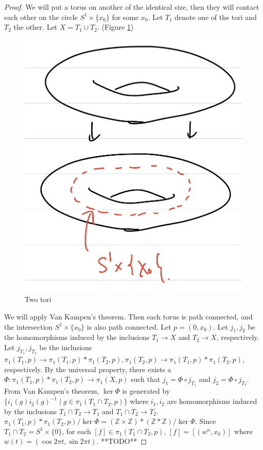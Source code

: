 \documentclass[12pt, psamsfonts]{amsart}
\theoremstyle{definition}
\theoremstyle{remark}
\numberwithin{equation}{section}
\begin{document}
\begin{proof}
  We will put a torus on another of the identical size, then they will contact each other on the circle $S^1 \times \{ x_0 \}$ for some $x_0$.
  Let $T_1$ denote one of the tori and $T_2$ the other.
  Let $X = T_1 \cup T_2$.
  (Figure \ref{fig:tori})
  \begin{figure}
    \includegraphics[width=.5\linewidth]{two-tori.jpeg}
      \caption{Two tori}
    \label{fig:tori}
  \end{figure}
  We will apply Van Kampen's theorem.
  Then each torus is path connected, and the intersection $S^1 \times \{ x_0 \}$ is also path connected.
  Let $p = (0, x_0)$.
  Let $j_1, j_2$ be the homomorphisms induced by the inclusions $T_1 \rightarrow X$ and $T_2 \rightarrow X$, respectively.
  Let $j_{T_1}, j_{T_2}$ be the inclusions $\pi_1(T_1, p) \rightarrow \pi_1(T_1, p) * \pi_1(T_2, p), \pi_1(T_2, p) \rightarrow \pi_1(T_1, p) * \pi_1(T_2, p)$, respectively.
  By the universal property, there exists a $\Phi: \pi_1(T_1, p) * \pi_1(T_2, p) \rightarrow \pi_1(X, p)$ such that $j_1 = \Phi \circ j_{T_1}$ and $j_2 = \Phi \circ j_{T_2}$.
  From Van Kampen's theorem, $\ker\Phi$ is generated by $\{ i_1(g)i_2(g)^{-1} \mid g \in \pi_1(T_1 \cap T_2, p) \}$ where $i_1, i_2$ are homomorphisms induced by the inclusions $T_1 \cap T_2 \rightarrow T_1$ and $T_1 \cap T_2 \rightarrow T_2$.
  $\pi_1(T_1, p) * \pi_1(T_2, p) / \ker\Phi = (\mathbb{Z} \times \mathbb{Z}) * (\mathbb{Z} * \mathbb{Z}) / \ker\Phi$.
  Since $T_1 \cap T_2 = S^1 \times \{ 0 \}$, for each $[f] \in \pi_1(T_1 \cap T_2, p)$, $[f] = [(w^n, x_0)]$ where $w(t) = (\cos 2\pi t, \sin 2\pi t)$.
  **TODO**
\end{proof}
\end{document}
